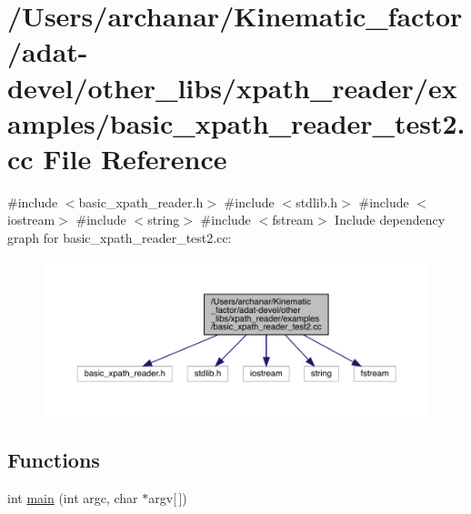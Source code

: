 \hypertarget{adat-devel_2other__libs_2xpath__reader_2examples_2basic__xpath__reader__test2_8cc}{}\section{/\+Users/archanar/\+Kinematic\+\_\+factor/adat-\/devel/other\+\_\+libs/xpath\+\_\+reader/examples/basic\+\_\+xpath\+\_\+reader\+\_\+test2.cc File Reference}
\label{adat-devel_2other__libs_2xpath__reader_2examples_2basic__xpath__reader__test2_8cc}
{\ttfamily \#include $<$basic\+\_\+xpath\+\_\+reader.\+h$>$}\newline
{\ttfamily \#include $<$stdlib.\+h$>$}\newline
{\ttfamily \#include $<$iostream$>$}\newline
{\ttfamily \#include $<$string$>$}\newline
{\ttfamily \#include $<$fstream$>$}\newline
Include dependency graph for basic\+\_\+xpath\+\_\+reader\+\_\+test2.\+cc\+:
\nopagebreak
\begin{figure}[H]
\begin{center}
\leavevmode
\includegraphics[width=350pt]{de/dda/adat-devel_2other__libs_2xpath__reader_2examples_2basic__xpath__reader__test2_8cc__incl}
\end{center}
\end{figure}
\subsection*{Functions}
\begin{DoxyCompactItemize}
\item 
int \mbox{\hyperlink{adat-devel_2other__libs_2xpath__reader_2examples_2basic__xpath__reader__test2_8cc_a0ddf1224851353fc92bfbff6f499fa97}{main}} (int argc, char $\ast$argv\mbox{[}$\,$\mbox{]})
\end{DoxyCompactItemize}


